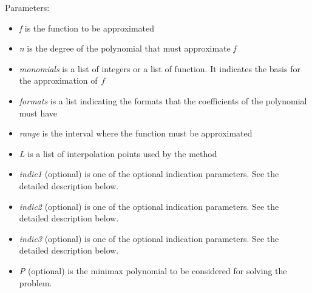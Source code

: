 Parameters: 
\begin{itemize}
\item \emph{f} is the function to be approximated
\item \emph{n} is the degree of the polynomial that must approximate \emph{f}
\item \emph{monomials} is a list of integers or a list of function. It indicates the basis for the approximation of~\emph{f}
\item \emph{formats} is a list indicating the formats that the coefficients of the polynomial must have
\item \emph{range} is the interval where the function must be approximated
\item \emph{L} is a list of interpolation points used by the method
\item \emph{indic1} (optional) is one of the optional indication parameters. See the detailed description below.
\item \emph{indic2} (optional) is one of the optional indication parameters. See the detailed description below.
\item \emph{indic3} (optional) is one of the optional indication parameters. See the detailed description below.
\item \emph{P} (optional) is the minimax polynomial to be considered for solving the problem.
\end{itemize}
